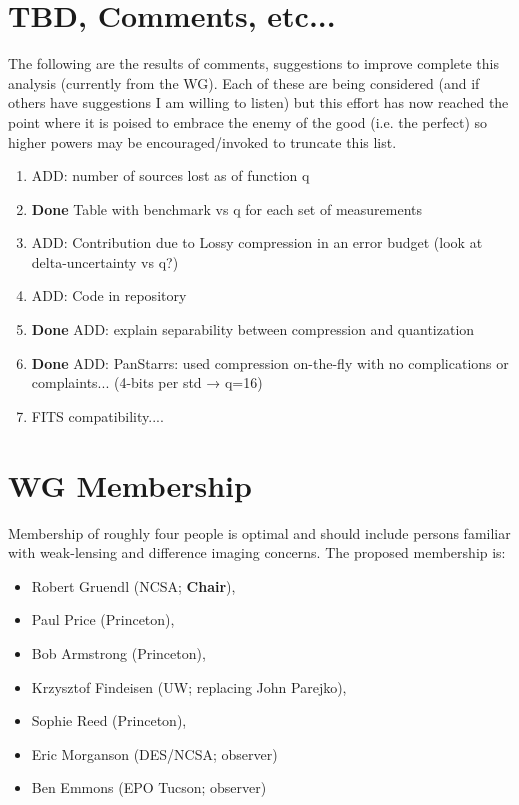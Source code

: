 \newpage
\section{TBD, Comments, etc...}\label{sec_tbd}

The following are the results of comments, suggestions to improve complete this analysis (currently from the WG).  
Each of these are being considered (and if others have suggestions I am willing to listen) but this effort has now reached 
the point where it is poised to embrace the enemy of the good (i.e. the perfect) so higher powers may be encouraged/invoked to truncate this list.

\begin{enumerate}
\item ADD:  number of sources lost as of function q
\item {\bf Done} Table with benchmark vs q for each set of measurements
\item ADD:  Contribution due to Lossy compression in an error budget (look at delta-uncertainty vs q?)
\item ADD:  Code in repository
\item {\bf Done}  ADD: explain separability between compression and quantization
\item {\bf Done} ADD: PanStarrs: used compression on-the-fly with no complications or complaints...  (4-bits per std → q=16)
\item FITS compatibility.... 
\end{enumerate}


\section{WG Membership}

Membership of roughly four people is optimal and should include persons familiar 
with weak-lensing and difference imaging concerns.
The proposed membership is:

\begin{itemize}
    \item Robert Gruendl (NCSA; \textbf{Chair}),
    \item Paul Price (Princeton),
    \item Bob Armstrong (Princeton),
    \item Krzysztof Findeisen (UW; replacing John Parejko),
    \item Sophie Reed (Princeton),
    \item Eric Morganson (DES/NCSA; observer)
    \item Ben Emmons (EPO Tucson; observer)
\end{itemize}

